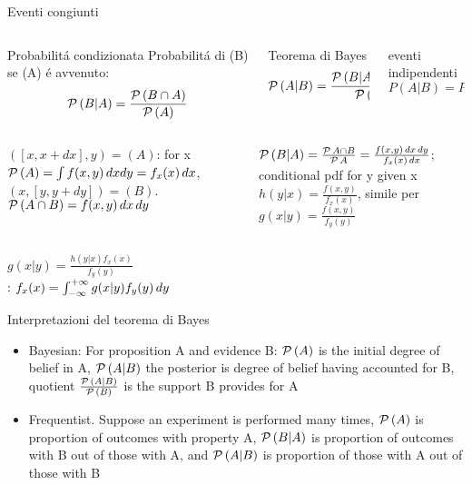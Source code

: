 \documentclass[asd-beamer.tex]{subfiles}
\begin{document}
\begin{frame}{Eventi congiunti}
\begin{columns}[T]
	\begin{column}{0.3\textwidth}
		\begin{block}{Probabilit\'a condizionata}
Probabilit\'a di (B) se (A) \'e avvenuto:
			\[\operatorname{\mathcal{P}}{(B|A)}=\frac{\operatorname{\mathcal{P}}{(B\cap A)}}{\operatorname{\mathcal{P}}{(A)}}\]
		\end{block}
	\end{column}
	\begin{column}{0.4\textwidth}
		\begin{block}{Teorema di Bayes}
			\[\operatorname{\mathcal{P}}{(A|B)}=\frac{\operatorname{\mathcal{P}}{(B|A)}\operatorname{\mathcal{P}}{(A)}}{\operatorname{\mathcal{P}}{(B)}}\]
		\end{block}
	\end{column}
	\begin{column}{0.25\textwidth}
		\begin{block}{eventi indipendenti}
			\[P(A|B)=P(A)\]
		\end{block}
	\end{column}
\end{columns}
\begin{columns}[T]\begin{column}{0.5\textwidth}
\begin{block}{}
$([x,x+dx],y)=(A)$:  for x $\operatorname{\mathcal{P}}{(A)}=\int f(x,y)\,dxdy=f_x(x)\,dx$, $(x,[y,y+dy])=(B)$. $\operatorname{\mathcal{P}}{(A\cap B)}=f(x,y)\,dx\,dy$
\end{block}
\end{column} \begin{column}{0.5\textwidth}
\begin{block}{}
$\operatorname{\mathcal{P}}{(B|A)}=\frac{\operatorname{\mathcal{P}}{A\cap B}}{\operatorname{\mathcal{P}}{A}}=\frac{f(x,y)\,dx\,dy}{f_x(x)\,dx}$; conditional pdf for y given x $h(y|x)=\frac{f(x,y)}{f_x(x)}$, simile per $g(x|y)=\frac{f(x,y)}{f_y(y)}$
\end{block}
\end{column}\end{columns}
 $g(x|y)=\frac{h(y|x)f_x(x)}{f_y(y)}$\\
: $f_x(x)=\int_{-\infty}^{+\infty}{}g(x|y)f_y(y)\,dy$
\end{frame}

\begin{frame}{Interpretazioni del teorema di Bayes}
\begin{itemize}
\item Bayesian: For proposition A and evidence B: $\operatorname{\mathcal{P}}{(A)}$ is the initial degree of belief in A, $\operatorname{\mathcal{P}}{(A|B)}$ the posterior is  degree of belief having accounted for B, quotient $\frac{\operatorname{\mathcal{P}}{(A|B)}}{\operatorname{\mathcal{P}}{(B)}}$ is the support B provides for A
\item Frequentist. Suppose an experiment is performed many times, $\operatorname{\mathcal{P}}{(A)}$ is proportion of outcomes with property A, $\operatorname{\mathcal{P}}{(B|A)}$ is proportion of outcomes with B out of those with A, and $\operatorname{\mathcal{P}}{(A|B)}$ is proportion of those with A out of those with B
\end{itemize}
\end{frame}
\end{document}
